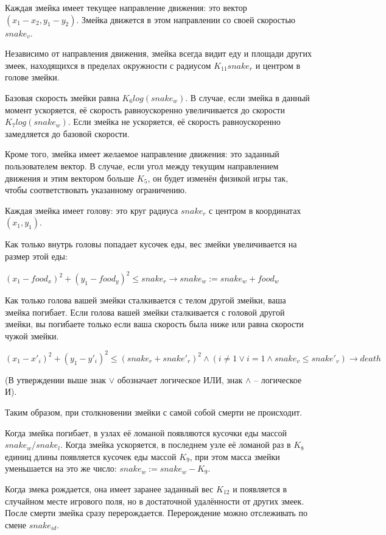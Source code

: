 \documentclass[12pt, a4paper]{article}
\begin{document}
Каждая змейка имеет текущее направление движения: это вектор $(x_1 - x_2, y_1 - y_2)$. Змейка движется в этом направлении со своей скоростью $snake_v$.

Независимо от направления движения, змейка всегда видит еду и площади других змеек, находящихся в пределах окружности с радиусом $K_{11} snake_r$ и центром в голове змейки.

Базовая скорость змейки равна $K_6 log(snake_w)$. В случае, если змейка в данный момент ускоряется, её скорость равноускоренно увеличивается до скорости $K_7 log(snake_w)$. Если змейка не ускоряется, её скорость равноускоренно замедляется до базовой скорости.

Кроме того, змейка имеет желаемое направление движения: это заданный пользователем вектор. В случае, если угол между текущим направлением движения и этим вектором больше $K_5$, он будет изменён физикой игры так, чтобы соответствовать указанному ограничению.

Каждая змейка имеет голову: это круг радиуса $snake_r$ с центром в координатах $(x_1, y_1)$.

Как только внутрь головы попадает кусочек еды, вес змейки увеличивается на размер этой еды:

$(x_1 - food_x)^2 + (y_1 - food_y)^2 \le snake_r \rightarrow snake_w := snake_w + food_w$

Как только голова вашей змейки сталкивается с телом другой змейки, ваша змейка погибает.
Если голова вашей змейки сталкивается с головой другой змейки, вы погибаете только если ваша скорость была ниже или равна скорости чужой змейки.

$(x_1 - x'_i)^2 + (y_1 - y'_i)^2 \le (snake_r + snake'_r)^2 \land (i \ne 1 \lor i = 1 \land snake_v \le snake'_v) \rightarrow death$

(В утверждении выше знак $\lor$ обозначает логическое ИЛИ, знак $\land$ -- логическое И).

Таким образом, при столкновении змейки с самой собой смерти не происходит.

Когда змейка погибает, в узлах её ломаной появляются кусочки еды массой $snake_w / snake_l$.
Когда змейка ускоряется, в последнем узле её ломаной раз в $K_8$ единиц длины появляется кусочек еды массой $K_9$, при этом масса змейки уменьшается на это же число: $snake_w := snake_w - K_9$.

Когда змека рождается, она имеет заранее заданный вес $K_12$ и появляется в случайном месте игрового поля, но в достаточной удалённости от других змеек. После смерти змейка сразу перерождается. Перерождение можно отслеживать по смене $snake_{id}$. 
\end{document}
